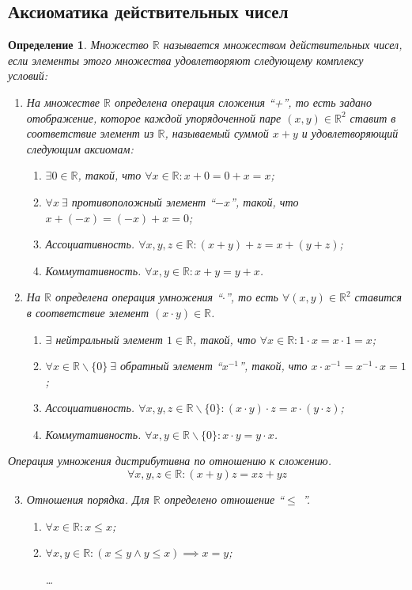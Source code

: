 \documentclass[a4paper,12pt]{article} %
\newtheorem{definition}{Определение}[subsection]
\theoremstyle{remark}
\begin{document}
\subsection{Аксиоматика действительных чисел}
\begin{definition}
	Множество $\mathbb{R}$ называется множеством действительных чисел, если элементы этого множества удовлетворяют следующему комплексу условий:
\begin{enumerate}
	\item На множестве $\mathbb{R}$ определена операция сложения ``+'', то есть задано отображение, которое каждой упорядоченной паре $(x, y)\in \mathbb{R}^2$ ставит в соответствие элемент из $\mathbb{R}$, называемый суммой $x+y$ и удовлетворяющий следующим аксиомам:
		\begin{enumerate}
			\item $\exists 0\in \mathbb{R}$, такой, что $\forall x\in \mathbb{R}:x+0=0+x=x$;
			\item $\forall x \ \exists$ противоположный элемент ``$-x$'', такой, что $x+(-x)=(-x)+x=0$;
			\item Ассоциативность. $\forall x, y, z\in \mathbb{R}:(x+y)+z=x+(y+z)$;
			\item Коммутативность. $\forall x, y\in \mathbb{R}:x+y=y+x$.
		\end{enumerate}
	\item На $\mathbb{R}$ определена операция умножения ``$\cdot$'', то есть $\forall(x, y)\in\mathbb{R}^2$ ставится в соответствие элемент $(x\cdot y)\in \mathbb{R}$.
		\begin{enumerate}
			\item $\exists $ нейтральный элемент $1\in \mathbb{R}$, такой, что $\forall x\in \mathbb{R}:1\cdot x=x\cdot 1=x$;
			\item $\forall x\in \mathbb{R}\backslash\{0\} \ \exists $ обратный элемент ``$x^{-1}$'', такой, что $x\cdot x^{-1}=x^{-1}\cdot x=1$;
			\item Ассоциативность. $\forall x, y, z\in \mathbb{R}\backslash\{0\}:(x\cdot y)\cdot z=x\cdot (y\cdot z)$;
			\item Коммутативность. $\forall x, y\in \mathbb{R}\backslash\{0\}:x\cdot y=y\cdot x$.
		\end{enumerate}
\end{enumerate}
	Операция умножения дистрибутивна по отношению к сложению. 
		$$\forall x, y, z\in \mathbb{R}:(x+y)z=xz+yz$$
\begin{enumerate}
\setcounter{enumi}{2}
	\item Отношения порядка. Для $\mathbb{R}$ определено отношение ``$\le $ ''.
		\begin{enumerate}
			\item $\forall x\in \mathbb{R}:x\le x$;
			\item $\forall x, y\in \mathbb{R}:(x\le y \land y\le x)\implies x=y$;
				
				\ldots
		\end{enumerate}
\end{enumerate}
	
\end{definition}
\end{document}
